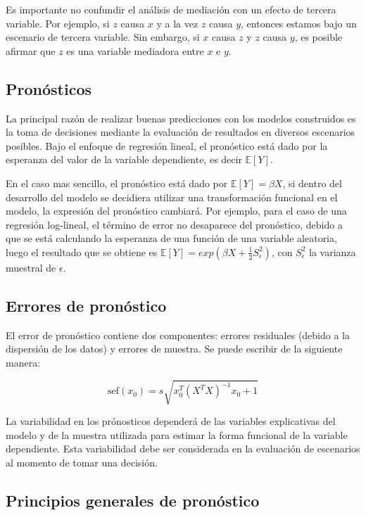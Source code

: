 \documentclass[
]{book}
\begin{document}
Es importante no confundir el análisis de mediación con un efecto de
tercera variable. Por ejemplo, si \(z\) causa \(x\) y a la vez \(z\) causa
\(y\), entonces estamos bajo un escenario de tercera variable. Sin
embargo, si \(x\) causa \(z\) y \(z\) causa \(y\), es posible afirmar que \(z\) es
una variable mediadora entre \(x\) e \(y\).

\subsection{Pronósticos}\label{pronuxf3sticos-1}

La principal razón de realizar buenas predicciones con los modelos
construidos es la toma de decisiones mediante la evaluación de
resultados en diversos escenarios posibles. Bajo el enfoque de regresión
lineal, el pronóstico está dado por la esperanza del valor de la
variable dependiente, es decir \(\mathbb{E}[Y]\).

En el caso mas sencillo, el pronóstico está dado por
\(\mathbb{E}[Y] = \beta X\), si dentro del desarrollo del modelo se
decidiera utilizar una transformación funcional en el modelo, la
expresión del pronóstico cambiará. Por ejemplo, para el caso de una
regresión log-lineal, el término de error no desaparece del pronóstico,
debido a que se está calculando la esperanza de una función de una
variable aleatoria, luego el resultado que se obtiene es
\(\mathbb{E}[Y] = exp(\beta X + \frac{1}{2}S_ϵ^2)\), con \(S_{ϵ}^2\) la
varianza muestral de \(ϵ\).

\subsection{Errores de pronóstico}\label{errores-de-pronuxf3stico-1}

El error de pronóstico contiene dos componentes: errores residuales
(debido a la dispersión de los datos) y errores de muestra. Se puede
escribir de la siguiente manera:

\[\text{sef}(x_0) = s\sqrt{x_0^T(X^TX)^{-1}x_0 + 1}\]

La variabilidad en los prónosticos dependerá de las variables
explicativas del modelo y de la muestra utilizada para estimar la forma
funcional de la variable dependiente. Esta variabilidad debe ser
considerada en la evaluación de escenarios al momento de tomar una
decisión.

\subsection{Principios generales de pronóstico}\label{principios-generales-de-pronuxf3stico-1}
\end{document}
